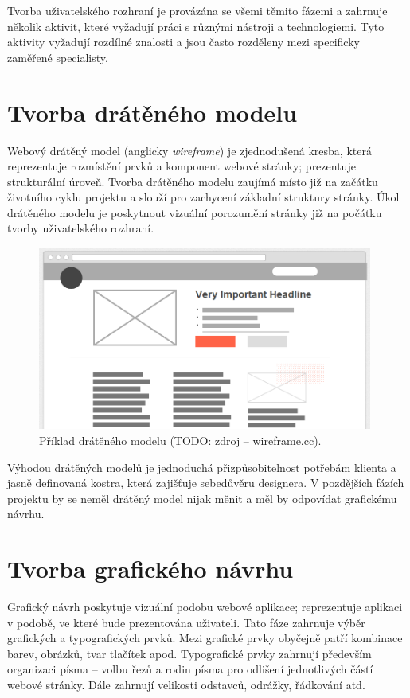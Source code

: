 Tvorba uživatelského rozhraní je provázána se všemi těmito fázemi a zahrnuje několik aktivit, které vyžadují práci s různými nástroji a technologiemi. Tyto aktivity vyžadují rozdílné znalosti a jsou často rozděleny mezi specificky zaměřené specialisty.

\section{Tvorba drátěného modelu}
\label{sec:wireframing}

Webový drátěný model (anglicky \textit{wireframe}) je zjednodušená kresba, která reprezentuje rozmístění prvků a komponent webové stránky; prezentuje strukturální úroveň. Tvorba drátěného modelu zaujímá místo již na začátku životního cyklu projektu a slouží pro zachycení základní struktury stránky. Úkol drátěného modelu je poskytnout vizuální porozumění stránky již na počátku tvorby uživatelského rozhraní.

\begin{figure}[htbp]
    \centering
    \includegraphics[width=11cm]{images/wireframe-example.png}
    \caption{Příklad drátěného modelu (TODO: zdroj -- wireframe.cc).}
\end{figure}

Výhodou drátěných modelů je jednoduchá přizpůsobitelnost potřebám klienta a jasně definovaná kostra, která zajišťuje sebedůvěru designera. V pozdějších fázích projektu by se neměl drátěný model nijak měnit a měl by odpovídat grafickému návrhu.

\section{Tvorba grafického návrhu}
\label{sec:designing}

Grafický návrh poskytuje vizuální podobu webové aplikace; reprezentuje aplikaci v podobě, ve které bude prezentována uživateli. Tato fáze zahrnuje výběr grafických a typografických prvků. Mezi grafické prvky obyčejně patří kombinace barev, obrázků, tvar tlačítek apod. Typografické prvky zahrnují především organizaci písma -- volbu řezů a rodin písma pro odlišení jednotlivých částí webové stránky. Dále zahrnují velikosti odstavců, odrážky, řádkování atd.

